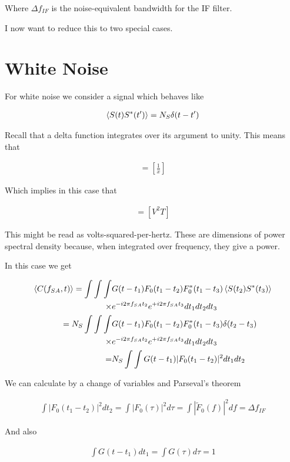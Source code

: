 \documentclass[12pt]{article}
\begin{document}
Where $\Delta f_{IF}$ is the noise-equivalent bandwidth for the IF filter.

I now want to reduce this to two special cases.

\section{White Noise}

For white noise we consider a signal which behaves like

\begin{align}
\Braket{S(t)S^*(t')} = N_S\delta(t - t')
\end{align}

Recall that a delta function integrates over its argument to unity. This means that 

\begin{align}
[\delta(x)] = \left[\frac{1}{x}\right]
\end{align}

Which implies in this case that

\begin{align}
[N_S] = [V^2T]
\end{align}

This might be read as volts-squared-per-hertz.
These are dimensions of power spectral density because, when integrated over frequency, they give a power.

In this case we get

\begin{align}
\Braket{C(f_{SA},t)} =\int \int \int &G(t-t_1)F_0(t_1-t_2)F_0^*(t_1-t_3)\Braket{S(t_2)S^*(t_3)}\\
\times& e^{-i2\pi f_{SA} t_2} e^{+i2\pi f_{SA}t_3} dt_1 dt_2 dt_3\\
=N_S\int \int \int &G(t-t_1)F_0(t_1-t_2)F_0^*(t_1-t_3)\delta(t_2-t_3)\\
\times& e^{-i2\pi f_{SA} t_2} e^{+i2\pi f_{SA}t_3} dt_1 dt_2 dt_3\\
=& N_S \int \int G(t-t_1) |F_0(t_1 - t_2)|^2 dt_1 dt_2
\end{align}

We can calculate by a change of variables and Parseval's theorem

\begin{align}
\int |F_0(t_1-t_2)|^2dt_2 = \int |F_0(\tau)|^2d\tau = \int|\tilde{F}_0(f)|^2 df = \Delta f_{IF}
\end{align}

And also

\begin{align}
\int G(t-t_1) dt_1 = \int G(\tau) d\tau =1
\end{align}
\end{document}
